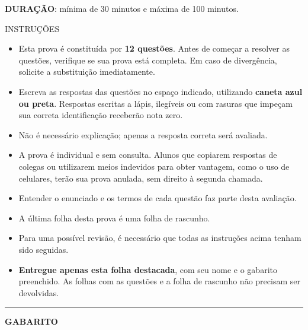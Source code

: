 \begin{titlepage}
\begin{tcolorbox}[width=\linewidth,colback=white]
    \end{tcolorbox}
    
    \noindent\textbf{DURAÇÃO}: mínima de 30 minutos e máxima de 100 minutos.
    
    \vspace{13pt}
    
    \begin{center}
        INSTRUÇÕES
    \end{center}

    \begin{itemize}[left=0pt, topsep=2pt, itemsep=2pt, parsep=0pt]
        \small
        \item Esta prova é constituída por \textbf{12 questões}. Antes de começar a resolver as questões, verifique se sua prova está completa. Em caso de divergência, solicite a substituição imediatamente.
        \item Escreva as respostas das questões no espaço indicado, utilizando \textbf{caneta azul ou preta}. Respostas escritas a lápis, ilegíveis ou com rasuras que impeçam sua correta identificação receberão nota zero.
        \item Não é necessário explicação; apenas a resposta correta será avaliada.
        \item A prova é individual e sem consulta. Alunos que copiarem respostas de colegas ou utilizarem meios indevidos para obter vantagem, como o uso de celulares, terão sua prova anulada, sem direito à segunda chamada.
        \item Entender o enunciado e os termos de cada questão faz parte desta avaliação.
        \item A última folha desta prova é uma folha de rascunho.
        \item Para uma possível revisão, é necessário que todas as instruções acima tenham sido seguidas.
        \item \textbf{Entregue apenas esta folha destacada}, com seu nome e o gabarito preenchido. As folhas com as questões e a folha de rascunho não precisam ser devolvidas.
    \end{itemize}

    \noindent\rule{\linewidth}{1pt}  %
    \vspace{10pt}
    
    \begin{center}
        \textbf{GABARITO}
    \end{center}
    \vspace{20pt}


\end{titlepage}
